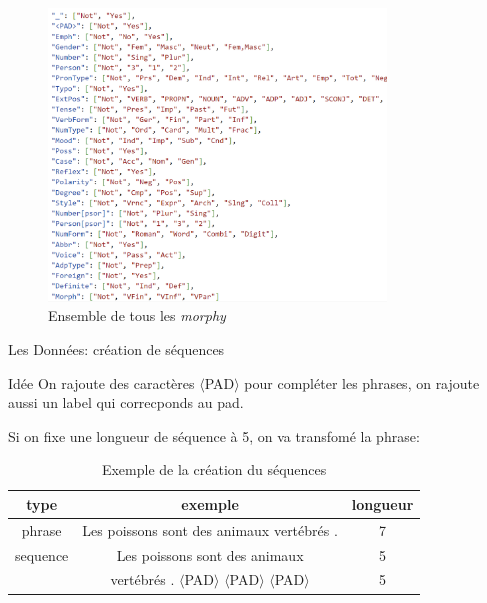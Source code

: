 \documentclass[11pt]{beamer}
\begin{document}
\begin{frame}
    \begin{figure}
        \centering
        \includegraphics[width=0.8\textwidth]{all_morphy.png}
        \caption{Ensemble de tous les \textit{morphy}}
    \end{figure}
\end{frame}

\begin{frame}{Les Données: création de séquences}
    \begin{exampleblock}{Idée}
        On rajoute des caractères $\langle$PAD$\rangle$ pour compléter les phrases,
        on rajoute aussi un label qui correcponds au pad.
    \end{exampleblock}

    \bigskip
    Si on fixe une longueur de séquence à 5, on va transfomé la phrase:
    \begin{table}
        \centering
        \begin{tabular}{|c|c|c|}
            \hline
            \textbf{type} & \textbf{exemple} & \textbf{longueur} \\
            \hline
            phrase & Les poissons sont des animaux vertébrés . & 7 \\
            \hline
            sequence & Les poissons sont des animaux & 5\\
             & vertébrés . $\langle$PAD$\rangle$ $\langle$PAD$\rangle$ $\langle$PAD$\rangle$ & 5\\
            \hline
        \end{tabular}
        \caption{Exemple de la création du séquences}
    \end{table}
\end{frame}
\end{document}
